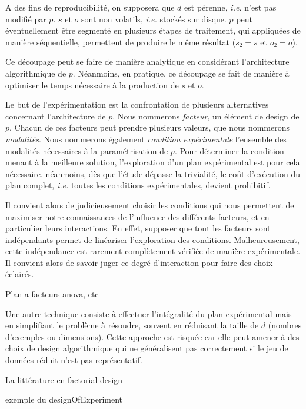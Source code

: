 A des fins de reproducibilité, on supposera que $d$ est pérenne, \textit{i.e.} n'est pas modifié par $p$. $s$ et $o$ sont non volatils, \textit{i.e.} stockés sur disque. $p$ peut éventuellement être segmenté en plusieurs étapes de traitement, qui appliquées de manière séquentielle, permettent de produire le même résultat ($s_2=s$ et $o_2=o$).


Ce découpage peut se faire de manière analytique en considérant l'architecture algorithmique de $p$. Néanmoins, en pratique, ce découpage se fait de manière à optimiser le temps nécessaire à la production de $s$ et $o$.

Le but de l'expérimentation est la confrontation de plusieurs alternatives concernant l'architecture de $p$. Nous nommerons \textsl{facteur}, un élément de design de $p$. Chacun de ces facteurs peut prendre plusieurs valeurs, que nous nommerons \textsl{modalités}. Nous nommerons également \textsl{condition expérimentale} l'ensemble des modalités nécessaires à la  paramétrisation de $p$. Pour déterminer la condition menant à la meilleure solution, l'exploration d'un plan expérimental est pour cela nécessaire. néanmoins, dès que l'étude dépasse la trivialité, le coût d'exécution du plan complet, \textit{i.e.} toutes les conditions expérimentales, devient prohibitif.

Il convient alors de judicieusement choisir les conditions qui nous permettent de maximiser notre connaissances de l'influence des différents facteurs, et en particulier leurs interactions. En effet, supposer que tout les facteurs sont indépendants permet de linéariser l'exploration des conditions. Malheureusement, cette indépendance est rarement complètement vérifiée de manière expérimentale. Il convient alors de savoir juger ce degré d'interaction pour faire des choix éclairés.

Plan a facteurs anova, etc

Une autre technique consiste à effectuer l'intégralité du plan expérimental mais en simplifiant le problème à résoudre, souvent en réduisant la taille de $d$ (nombres d'exemples ou dimensions). Cette approche est risquée car elle peut amener à des choix de design algorithmique qui ne généralisent pas correctement si le jeu de données réduit n'est pas représentatif.

La littérature en factorial design

exemple du designOfExperiment 

